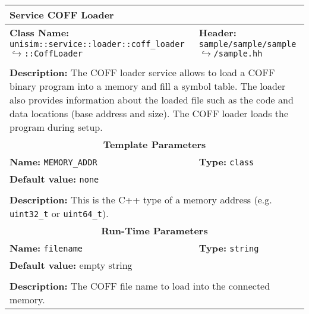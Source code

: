 \newpage
\begin{center}
	\begin{tabular}{|p{7.5cm}|p{7.5cm}|}
		\hline
		\multicolumn{2}{|l|}{\textbf{\Large Service COFF Loader}}\\
		\hline
		\multicolumn{1}{|p{7.5cm}}{\textbf{Class Name:} \newline \texttt{unisim::service::loader::coff\_loader}\newline$\hookrightarrow$\texttt{::CoffLoader}} & \multicolumn{1}{p{7.5cm}|}{\textbf{Header:} \newline \texttt{sample/sample/sample}\newline$\hookrightarrow$\texttt{/sample.hh}}\\
		\multicolumn{2}{|l|}{}\\
		\multicolumn{2}{|p{15cm}|}{\textbf{Description:} \newline The COFF loader service allows to load a COFF binary program into a memory and fill a symbol table. The loader also provides information about the loaded ﬁle such as the code and data locations (base address and size). The COFF loader loads the program during setup.}\\
		\hline
		\hline
		\multicolumn{2}{|c|}{\textbf{\large Template Parameters}}\\
		\hline
		\multicolumn{1}{|p{7.5cm}}{\textbf{Name:} \texttt{MEMORY\_ADDR}} & \multicolumn{1}{p{7.5cm}|}{\textbf{Type:} \texttt{class}}\\
		\multicolumn{2}{|p{15cm}|}{\textbf{Default value:} \texttt{none}}\\
		\multicolumn{2}{|l|}{}\\
		\multicolumn{2}{|p{15cm}|}{\textbf{Description:} \newline This is the C++ type of a memory address (e.g. \texttt{uint32\_t} or \texttt{uint64\_t}).}\\
		\hline
		\hline
		\multicolumn{2}{|c|}{\textbf{\large Run-Time Parameters}}\\
		\hline
		\multicolumn{1}{|p{7.5cm}}{\textbf{Name:} \texttt{filename}} & \multicolumn{1}{p{7.5cm}|}{\textbf{Type:} \texttt{string}}\\
		\multicolumn{2}{|p{15cm}|}{\textbf{Default value:} empty string}\\
		\multicolumn{2}{|l|}{}\\
		\multicolumn{2}{|p{15cm}|}{\textbf{Description:} \newline The COFF file name to load into the connected memory.}\\

\end{tabular}
\end{center}
